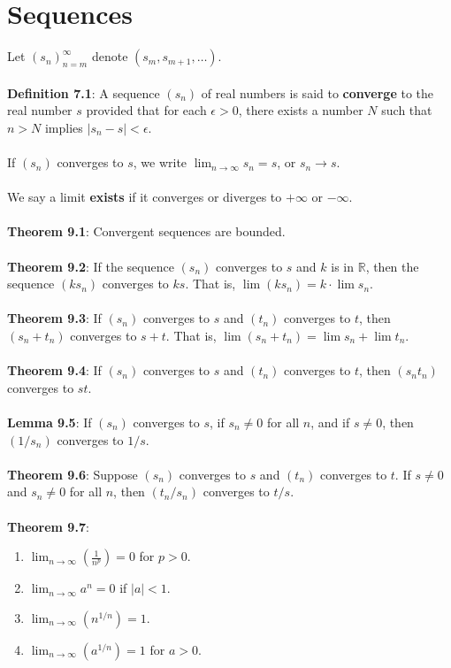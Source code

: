 \documentclass{article}
\theoremstyle{definition}
\begin{document}
\section*{Sequences}
Let $(s_n)_{n = m}^\infty$ denote $(s_m, s_{m + 1}, \dots)$. \\ \\
\textbf{Definition 7.1}: A sequence $(s_n)$ of real numbers is said to \textbf{converge} to the real number $s$ provided that for each $\epsilon > 0$, there exists a number $N$ such that $n > N$ implies $|s_n - s| < \epsilon$. \\ \\
If $(s_n)$ converges to $s$, we write $\lim_{n \rightarrow \infty}s_n = s$, or $s_n \rightarrow s$. \\ \\
We say a limit \textbf{exists} if it converges or diverges to $+\infty$ or $-\infty$. \\ \\
\textbf{Theorem 9.1}: Convergent sequences are bounded. \\ \\
\textbf{Theorem 9.2}: If the sequence $(s_n)$ converges to $s$ and $k$ is in $\mathbb{R}$, then the sequence $(ks_n)$ converges to $ks$. That is, $\lim(ks_n) = k · \lim{s_n}$. \\ \\
\textbf{Theorem 9.3}: If $(s_n)$ converges to $s$ and $(t_n)$ converges to $t$, then $(s_n + t_n)$ converges to $s + t$. That is, $\lim(s_n + t_n) = \lim{s_n} + \lim{t_n}$. \\ \\
\textbf{Theorem 9.4}: If $(s_n)$ converges to $s$ and $(t_n)$ converges to $t$, then $(s_nt_n)$ converges to $st$. \\ \\
\textbf{Lemma 9.5}: If $(s_n)$ converges to $s$, if $s_n \neq 0$ for all $n$, and if $s \neq 0$, then $(1/s_n)$ converges to $1/s$. \\ \\
\textbf{Theorem 9.6}: Suppose $(s_n)$ converges to $s$ and $(t_n)$ converges to $t$. If $s \neq 0$ and $s_n \neq 0$ for all $n$, then $(t_n/s_n)$ converges to $t/s$. \\ \\
\textbf{Theorem 9.7}: \begin{enumerate}
    \item $\lim_{n \rightarrow \infty}(\frac{1}{n^p}) = 0$ for $p > 0$.
    \item $\lim_{n \rightarrow \infty} a^n = 0$ if $|a| < 1$.
    \item $\lim_{n \rightarrow \infty}(n^{1/n}) = 1$.
    \item $\lim_{n \rightarrow \infty}(a^{1/n}) = 1$ for $a > 0$.
\end{enumerate} $ $ \\
\end{document}
